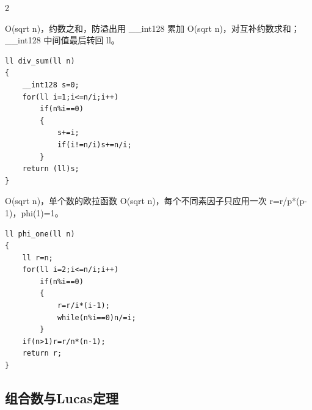 \documentclass[UTF8,fontset=fandol,a4paper,twoside]{ctexart}
\newcommand{\note}[1]{{\fontsize{10}{12}\selectfont #1\par}}
\begin{document}
\begin{multicols}{2}
\note{O(\allowbreak{}sqrt n)\allowbreak{}，约数之和，防溢出用 \_\_int128 累加 O(\allowbreak{}sqrt n)\allowbreak{}，对互补约数求和；\_\_int128 中间值最后转回 ll。}
\begin{lstlisting}
ll div_sum(ll n)
{
    __int128 s=0;
    for(ll i=1;i<=n/i;i++)
        if(n%i==0)
        {
            s+=i;
            if(i!=n/i)s+=n/i;
        }
    return (ll)s;
}
\end{lstlisting}
\note{O(\allowbreak{}sqrt n)\allowbreak{}，单个数的欧拉函数 O(\allowbreak{}sqrt n)\allowbreak{}，每个不同素因子只应用一次 r=\allowbreak{}r/\allowbreak{}p*(\allowbreak{}p-\allowbreak{}1)\allowbreak{}，phi(\allowbreak{}1)\allowbreak{}=\allowbreak{}1。}
\begin{lstlisting}
ll phi_one(ll n)
{
    ll r=n;
    for(ll i=2;i<=n/i;i++)
        if(n%i==0)
        {
            r=r/i*(i-1);
            while(n%i==0)n/=i;
        }
    if(n>1)r=r/n*(n-1);
    return r;
}
\end{lstlisting}
\subsection{组合数与Lucas定理}


\end{multicols}
\end{document}
